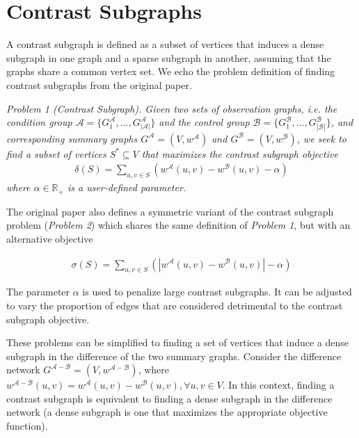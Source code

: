 \documentclass[letterpaper]{article}
\begin{document}
\section{Contrast Subgraphs} \label{cs}

A contrast subgraph is defined as a subset of vertices that induces a dense subgraph in one graph and a sparse subgraph in another, assuming that the graphs share a common vertex set.
We echo the problem definition of finding contrast subgraphs from the original paper.

\emph{Problem 1 (Contrast Subgraph). Given two sets of observation graphs, i.e. the condition group $\mathcal{A} = \{G^{\mathcal{A}}_1, . . . , G^{\mathcal{A}}_{|\mathcal{A}|}\}$ and the control group $\mathcal{B} = \{G^{\mathcal{B}}_1, . . . , G^{\mathcal{B}}_{|\mathcal{B}|}\}$, and corresponding summary graphs $G^{\mathcal{A}} = (V, w^{\mathcal{A}})$ and $G^{\mathcal{B}} = (V, w^{\mathcal{B}})$, we seek to find a subset of vertices $S^* \subseteq V$ that maximizes the contrast subgraph objective}
\begin{align*}
    \delta (S) = \sum_{u,v \in S} \left(w^{\mathcal{A}}(u,v) - w^{\mathcal{B}}(u,v) - \alpha\right)
\end{align*}
\emph{where $\alpha \in \mathbb{R}_+$ is a user-defined parameter.}

The original paper also defines a symmetric variant of the contrast subgraph problem (\emph{Problem 2}) which shares the same definition of \emph{Problem 1}, but with an alternative objective

\begin{align*}
    \sigma (S) = \sum_{u,v \in S} \left(|w^{\mathcal{A}}(u,v) - w^{\mathcal{B}}(u,v)| - \alpha\right)
\end{align*}

The parameter $\alpha$ is used to penalize large contrast subgraphs.
It can be adjusted to vary the proportion of edges that are considered detrimental to the contrast subgraph objective.

These problems can be simplified to finding a set of vertices that induce a dense subgraph in the difference of the two summary graphs.
Consider the difference network  $G^{\mathcal{A} - \mathcal{B}} = (V, w^{\mathcal{A} - \mathcal{B}})$, where \\ $w^{\mathcal{A} - \mathcal{B}}(u,v) = w^{\mathcal{A}}(u,v) - w^{\mathcal{B}}(u,v), \forall u,v \in V$.
In this context, finding a contrast subgraph is equivalent to finding a dense subgraph in the difference network (a dense subgraph is one that maximizes the appropriate objective function).
\end{document}
